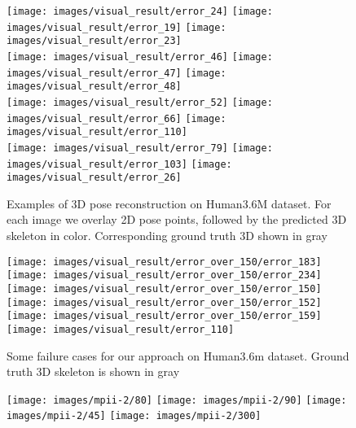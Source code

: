 \documentclass[runningheads]{llncs}
\begin{document}
\begin{figure}[htb!]
	\centering
	\texttt{[image: images/visual\_result/error\_24]}
	\texttt{[image: images/visual\_result/error\_19]}
	\texttt{[image: images/visual\_result/error\_23]}\\
	
	\texttt{[image: images/visual\_result/error\_46]}
	\texttt{[image: images/visual\_result/error\_47]}
	\texttt{[image: images/visual\_result/error\_48]}\\
	
	\texttt{[image: images/visual\_result/error\_52]}
	\texttt{[image: images/visual\_result/error\_66]}
	\texttt{[image: images/visual\_result/error\_110]}\\

	\texttt{[image: images/visual\_result/error\_79]}
	\texttt{[image: images/visual\_result/error\_103]}
	\texttt{[image: images/visual\_result/error\_26]}
	\\
	
	\caption{Examples of 3D pose reconstruction on Human3.6M dataset. For each image we overlay 2D pose points, followed by the predicted 3D skeleton in color. Corresponding ground truth 3D shown in gray}
	\label{fig:h36good}
\end{figure}\begin{figure}[htb]
	\centering
\texttt{[image: images/visual\_result/error\_over\_150/error\_183]}
\texttt{[image: images/visual\_result/error\_over\_150/error\_234]}
\texttt{[image: images/visual\_result/error\_over\_150/error\_150]} \\
\texttt{[image: images/visual\_result/error\_over\_150/error\_152]}
\texttt{[image: images/visual\_result/error\_over\_150/error\_159]}
\texttt{[image: images/visual\_result/error\_110]}
	\caption{Some failure cases for our approach on Human3.6m dataset. Ground truth 3D skeleton is shown in gray}
	\label{fig:h3failure}
\end{figure}\begin{figure}[htb!]
	\centering
	\texttt{[image: images/mpii-2/80]}
	\texttt{[image: images/mpii-2/90]}	
	\texttt{[image: images/mpii-2/45]}
	\texttt{[image: images/mpii-2/300]}\\


\end{figure}
\end{document}
